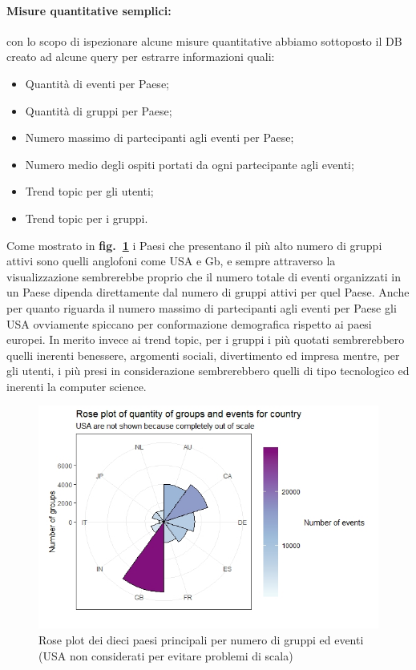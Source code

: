 \documentclass[fleqn,10pt]{SelfArx} %
\begin{document}
{\paragraph{Misure quantitative semplici:}
con lo scopo di ispezionare alcune misure quantitative abbiamo sottoposto il DB creato ad alcune query per estrarre informazioni quali:
\begin{itemize}[noitemsep]
\item Quantità di eventi per Paese;
\item Quantità di gruppi per Paese;
\item Numero massimo di partecipanti agli eventi per Paese;
\item Numero medio degli ospiti portati da ogni partecipante agli eventi;
\item Trend topic per gli utenti;
\item Trend topic per i gruppi.
\end{itemize}
Come mostrato in \textbf{fig.~\ref{rose_plot}} i Paesi che presentano il più alto numero di gruppi attivi sono quelli anglofoni come USA e Gb, e sempre attraverso la visualizzazione sembrerebbe proprio che il numero totale di eventi organizzati in un Paese dipenda direttamente dal numero di gruppi attivi per quel Paese.
Anche per quanto riguarda il numero massimo di partecipanti agli eventi per Paese gli USA ovviamente spiccano per conformazione demografica rispetto ai paesi europei.
In merito invece ai trend topic, per i gruppi i più quotati sembrerebbero quelli inerenti benessere, argomenti sociali, divertimento ed impresa mentre, per gli utenti, i più presi in considerazione sembrerebbero quelli di tipo tecnologico ed inerenti la computer science.
\begin{figure}
\centering
\includegraphics[width = 9.2 cm, height = 5 cm]{rose_plot_quantitative.jpeg}
\vspace*{0.01cm}
\caption{\footnotesize \label{rose_plot}Rose plot dei dieci paesi principali per numero di gruppi ed eventi (USA non considerati per evitare problemi di scala)}
\end{figure}
}
\end{document}
